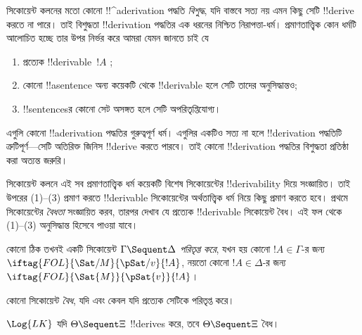 \documentclass[../../../include/open-logic-section]{subfiles}
\begin{document}
      {}
      {}


\begin{explain}
সিকোয়েন্ট কলনের মতো কোনো !!^a{derivation} পদ্ধতি \emph{বিশুদ্ধ}, যদি
বাস্তবে সত্য নয় এমন কিছু সেটি !!{derive} করতে না পারে। তাই বিশুদ্ধতা
!!{derivation} পদ্ধতির এক ধরনের নিশ্চিত নিরাপত্তা-ধর্ম। প্রমাণতাত্ত্বিক
কোন ধর্মটি আলোচিত হচ্ছে তার উপর নির্ভর করে আমরা যেমন জানতে চাই যে
\begin{enumerate}
\item প্রত্যেক !!{derivable}~$!A$ ;
\item কোনো !!a{sentence} অন্য কয়েকটি থেকে !!{derivable} হলে সেটি
  তাদের অনুসিদ্ধান্তও;
\item !!{sentence}sর কোনো সেট অসঙ্গত হলে সেটি অপরিতৃপ্তিযোগ্য।
\end{enumerate}
এগুলি কোনো !!a{derivation} পদ্ধতির গুরুত্বপূর্ণ ধর্ম। এগুলির একটিও সত্য
না হলে !!{derivation} পদ্ধতিটি ত্রুটিপূর্ণ—সেটি অতিরিক্ত জিনিস
!!{derive} করতে পারবে। তাই কোনো !!{derivation} পদ্ধতির বিশুদ্ধতা
প্রতিষ্ঠা করা অত্যন্ত জরুরি।

সিকোয়েন্ট কলনে এই সব প্রমাণতাত্ত্বিক ধর্ম কয়েকটি বিশেষ সিকোয়েন্টের
!!{derivability} দিয়ে সংজ্ঞায়িত। তাই উপরের (1)--(3) প্রমাণ করতে
!!{derivable} সিকোয়েন্টের অর্থতাত্ত্বিক ধর্ম নিয়ে কিছু প্রমাণ করতে হবে।
প্রথমে সিকোয়েন্টের \emph{বৈধতা} সংজ্ঞায়িত করব, তারপর দেখাব যে প্রত্যেক
!!{derivable} সিকোয়েন্ট বৈধ। এই ফল থেকে (1)--(3) অনুসিদ্ধান্ত হিসেবে
পাওয়া যাবে।
\end{explain}

\begin{defn}
কোনো  ঠিক তখনই একটি সিকোয়েন্ট
$\Gamma \Sequent \Delta$ \emph{পরিতৃপ্ত করে}, যখন হয় কোনো
$!A \in \Gamma$-র জন্য $\iftag{FOL}{\Sat/{M}}{\pSat/{v}}{!A}$, নয়তো
কোনো $!A \in \Delta$-র জন্য $\iftag{FOL}{\Sat{M}}{\pSat{v}}{!A}$।

কোনো সিকোয়েন্ট \emph{বৈধ}, যদি এবং কেবল যদি প্রত্যেক
 সেটিকে পরিতৃপ্ত করে।
\end{defn}

\begin{thm}[বিশুদ্ধতা]
 $\Log{LK}$ যদি $\Theta
\Sequent \Xi$ !!{derive}s করে, তবে $\Theta \Sequent \Xi$ বৈধ।
\end{thm}
\end{document}
